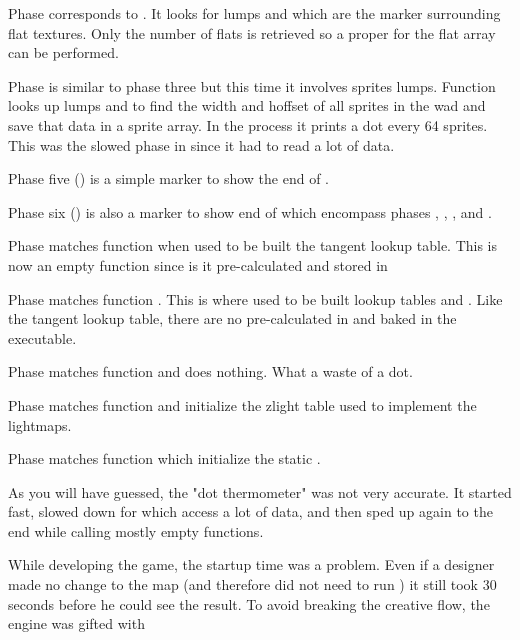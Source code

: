 Phase  corresponds to . It looks for lumps  and  which are the marker surrounding flat textures. Only the number of flats is retrieved so a proper  for the flat array can be performed.\\
\par

Phase  is similar to phase three but this time it involves sprites lumps. Function  looks up lumps  and  to find the width and hoffset of all sprites in the wad  and save that data in a sprite array. In the process it prints a dot every 64 sprites. This was the slowed phase in  since it had to read a lot of data.\\
\par

Phase five () is a simple marker to show the end of .\\
\par

Phase six () is also a marker to show end of  which encompass phases , , , and .\\
\par

Phase  matches function  when used to be built the tangent lookup table. This is now an empty function since is it pre-calculated and stored in \\
\par

Phase  matches function . This is where used to be built lookup tables  and . Like the tangent lookup table, there are no pre-calculated in  and baked in the executable.\\
\par

Phase  matches function  and does nothing. What a waste of a dot.\\
\par

Phase  matches function  and initialize the zlight table used to implement the lightmaps.\\
\par

Phase  matches function  which initialize the static .\\
\par
As you will have guessed, the "dot thermometer" was not very accurate. It started fast, slowed down for  which access a lot of data, and then sped up again to the end while calling mostly empty functions.\\
\par
While developing the game, the startup time was a problem. Even if a designer made no change to the map (and therefore did not need to run ) it still took 30 seconds before he could see the result. To avoid breaking the creative flow, the engine was gifted with 